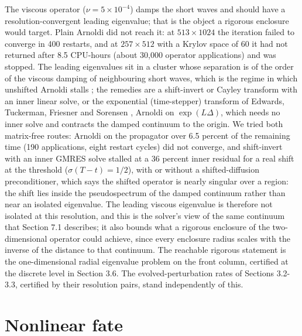 \documentclass[11pt]{article}
\newcommand{\sn}[2]{#1\times 10^{#2}}
\begin{document}
The viscous operator ($\nu = \sn{5}{-4}$) damps the short waves and should have a resolution-convergent leading eigenvalue; that is the object a rigorous enclosure would target. Plain Arnoldi did not reach it: at $513 \times 1024$ the iteration failed to converge in 400 restarts, and at $257 \times 512$ with a Krylov space of 60 it had not returned after 8.5 CPU-hours (about 30,000 operator applications) and was stopped. The leading eigenvalues sit in a cluster whose separation is of the order of the viscous damping of neighbouring short waves, which is the regime in which unshifted Arnoldi stalls \cite{MR96,LS01,T11}; the remedies are a shift-invert or Cayley transform with an inner linear solve, or the exponential (time-stepper) transform of Edwards, Tuckerman, Friesner and Sorensen \cite{ETFS94}, Arnoldi on $\exp(L \Delta)$, which needs no inner solve and contracts the damped continuum to the origin. We tried both matrix-free routes: Arnoldi on the propagator over 6.5 percent of the remaining time (190 applications, eight restart cycles) did not converge, and shift-invert with an inner GMRES solve stalled at a 36 percent inner residual for a real shift at the threshold ($\sigma (T - t) = 1/2$), with or without a shifted-diffusion preconditioner, which says the shifted operator is nearly singular over a region: the shift lies inside the pseudospectrum of the damped continuum rather than near an isolated eigenvalue. The leading viscous eigenvalue is therefore not isolated at this resolution, and this is the solver's view of the same continuum that Section 7.1 describes; it also bounds what a rigorous enclosure of the two-dimensional operator could achieve, since every enclosure radius scales with the inverse of the distance to that continuum. The reachable rigorous statement is the one-dimensional radial eigenvalue problem on the front column, certified at the discrete level in Section 3.6. The evolved-perturbation rates of Sections 3.2-3.3, certified by their resolution pairs, stand independently of this.

\section{Nonlinear fate}
\end{document}
